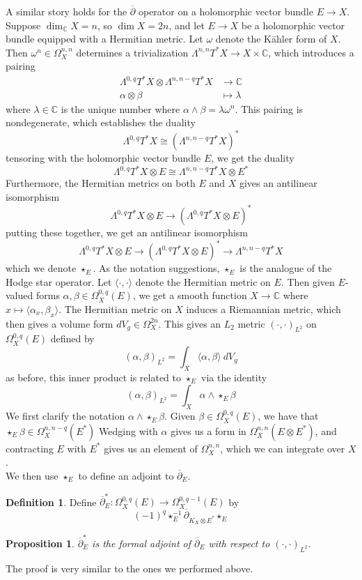 \documentclass[psamsfonts, 12pt]{amsart}
\newtheorem{prop}[thm]{Proposition}
\theoremstyle{definition}
\newtheorem{defn}[thm]{Definition}
\theoremstyle{remark}
\newcommand{\C}{\mathbb{C}}
\newcommand{\dbar}{\overline{\partial}}
\newcommand{\inv}{^{-1}}
\begin{document}
%
A similar story holds for the $\dbar$ operator on a holomorphic vector bundle
$E \to X$. Suppose $\dim_\C X = n$, so $\dim X = 2n$, and let $E \to X$ be a
holomorphic vector bundle equipped with a Hermitian metric. Let $\omega$ denote
the K\"ahler form of $X$. Then $\omega^n \in \Omega^{n,n}_X$ determines a trivialization
$\Lambda^{n,n}T^*X \to X \times\C$, which introduces a pairing
\begin{align*}
\Lambda^{0,q}T^*X \otimes \Lambda^{n,n-q}T^*X &\to \C \\
\alpha\otimes\beta &\mapsto \lambda
\end{align*}
where $\lambda \in \C$ is the unique number where $\alpha\wedge\beta = \lambda\omega^n$.
This pairing is nondegenerate, which establishes the duality
\[
\Lambda^{0,q}T^*X \cong (\Lambda^{n,n-q}T^*X)^*
\]
tensoring with the holomorphic vector bundle $E$, we get the duality
\[
\Lambda^{0,q}T^*X \otimes E \cong \Lambda^{n,n-q}T^*X \otimes E^*
\]
Furthermore, the Hermitian metrics on both $E$ and $X$ gives an antilinear isomorphism
\[
\Lambda^{0,q}T^*X \otimes E \to (\Lambda^{0,q}T^*X \otimes E)^*
\]
putting these together, we get an antilinear isomorphism
\[
\Lambda^{0,q}T^*X \otimes E \to (\Lambda^{0,q}T^*X \otimes E)^* \to \Lambda^{n,n-q}T^*X
\]
which we denote $\star_E$. As the notation suggestions, $\star_E$ is the analogue of
the Hodge star operator. Let $\langle\cdot,\cdot\rangle$ denote the Hermitian metric
on $E$. Then given $E$-valued forms $\alpha,\beta \in \Omega^{0,q}_X(E)$, we get
a smooth function $X \to \C$ where $x\mapsto \langle\alpha_x,\beta_x\rangle$. The
Hermitian metric on $X$ induces a Riemannian metric, which then gives a volume form
$dV_g \in \Omega^{2n}_X$. This gives an $L_2$ metric $(\cdot,\cdot)_{L^2}$ on
$\Omega^{0,q}_X(E)$ defined by
\[
(\alpha,\beta)_{L^2} = \int_X \langle\alpha,\beta\rangle~dV_g
\]
as before, this inner product is related to $\star_E$ via the identity
\[
(\alpha,\beta)_{L^2} = \int_X\alpha\wedge\star_E\beta
\]
We first clarify the notation $\alpha\wedge\star_E\beta$. Given
$\beta\in\Omega^{0,q}_X(E)$, we have that $\star_E\beta \in \Omega^{n,n-q}_X(E^*)$
Wedging with $\alpha$ gives us a form in $\Omega^{n,n}_X(E \otimes E^*)$, and
contracting $E$ with $E^*$ gives us an element of $\Omega_X^{n,n}$, which we can
integrate over $X$. \\

We then use $\star_E$ to define an adjoint to $\dbar_E$.
%
\begin{defn}
Define $\dbar_E^* : \Omega^{0,q}_X(E) \to \Omega^{0,q-1}_X(E)$ by
\[
(-1)^q\star_E\inv\dbar_{K_X\otimes E^*}\star_E
\]
\end{defn}
%
\begin{prop}
$\dbar_E^*$ is the formal adjoint of $\dbar_E$ with respect to $(\cdot,\cdot)_{L^2}$.
\end{prop}
%
The proof is very similar to the ones we performed above. \\
\end{document}
